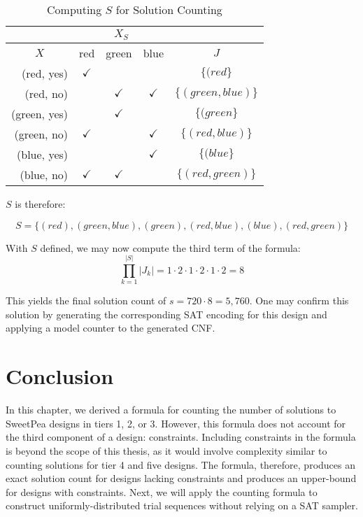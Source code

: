 \begin{table}[htb]
  \centering
  \caption{Computing $S$ for Solution Counting}
\begin{tabular}{r|c|c|c|c}
\cline{2-4}
\multicolumn{1}{c|}{}              & \multicolumn{3}{c|}{$X_S$}                 & \multicolumn{1}{l}{}                     \\ \hline
\multicolumn{1}{|c|}{$X$}          & red          & green        & blue         & \multicolumn{1}{c|}{$J$}                 \\ \hline
\multicolumn{1}{|r|}{(red, yes)}   & $\checkmark$ &              &              & \multicolumn{1}{c|}{$\{(red\}$}         \\ \hline
\multicolumn{1}{|r|}{(red, no)}    &              & $\checkmark$ & $\checkmark$ & \multicolumn{1}{c|}{$\{(green, blue)\}$} \\ \hline
\multicolumn{1}{|r|}{(green, yes)} &              & $\checkmark$ &              & \multicolumn{1}{c|}{$\{(green\}$}       \\ \hline
\multicolumn{1}{|r|}{(green, no)}  & $\checkmark$ &              & $\checkmark$ & \multicolumn{1}{c|}{$\{(red, blue)\}$}   \\ \hline
\multicolumn{1}{|r|}{(blue, yes)}  &              &              & $\checkmark$ & \multicolumn{1}{c|}{$\{(blue\}$}        \\ \hline
\multicolumn{1}{|r|}{(blue, no)}   & $\checkmark$ & $\checkmark$ &              & \multicolumn{1}{c|}{$\{(red, green)\}$}  \\ \hline
\end{tabular}
\label{tab:example_s}%
\end{table}

$S$ is therefore:

\[
S = \{(red), (green, blue), (green), (red, blue), (blue), (red, green)\}
\]

With $S$ defined, we may now compute the third term of the formula:
\[
    \prod_{k=1}^{|S|} |J_k| = 1 \cdot 2 \cdot 1 \cdot 2 \cdot 1 \cdot 2 = 8
\]

This yields the final solution count of $s = 720 \cdot 8 = 5,760$. One may confirm this solution by generating the corresponding SAT encoding for this design and applying a model counter to the generated CNF.

\section{Conclusion}

In this chapter, we derived a formula for counting the number of solutions to SweetPea designs in tiers 1, 2, or 3. However, this formula does not account for the third component of a design: constraints. Including constraints in the formula is beyond the scope of this thesis, as it would involve complexity similar to counting solutions for tier 4 and five designs. The formula, therefore, produces an exact solution count for designs lacking constraints and produces an upper-bound for designs with constraints. Next, we will apply the counting formula to construct uniformly-distributed trial sequences without relying on a SAT sampler.

